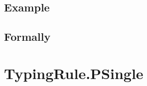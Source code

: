 \documentclass{book}
\begin{document}
  \subsection{Example}



\begin{emptyformal}
    \subsection{Formally}
\end{emptyformal}


\section{TypingRule.PSingle \label{sec:TypingRule.PSingle}}
\end{document}
